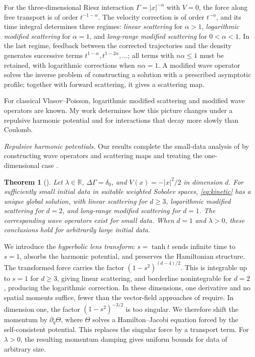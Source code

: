 \documentclass[10pt,reqno]{amsart}
\newtheorem{theorem}{Theorem}
\newcommand{\R}{\mathbb R}
\begin{document}
For the three-dimensional Riesz interaction $\Gamma=|x|^{-\alpha}$ with $V=0$, the force along free transport is of order $t^{-1-\alpha}$. The velocity correction is of order $t^{-\alpha}$, and its time integral determines three regimes: \emph{linear scattering} for $\alpha>1$, \emph{logarithmic modified scattering} for $\alpha=1$, and \emph{long-range modified scattering} for $0<\alpha<1$. In the last regime, feedback between the corrected trajectories and the density generates successive terms $t^{1-\alpha},t^{1-2\alpha},\ldots$; all terms with $n\alpha\leq1$ must be retained, with logarithmic corrections when $n\alpha=1$. A modified wave operator solves the inverse problem of constructing a solution with a prescribed asymptotic profile; together with forward scattering, it gives a scattering map.

For classical Vlasov--Poisson, logarithmic modified scattering \cite{CK16,IPWW22} and modified wave operators \cite{FOPW21} are known. My work determines how this picture changes under a repulsive harmonic potential and for interactions that decay more slowly than Coulomb.

\smallskip
\noindent\emph{Repulsive harmonic potentials.}
Our results complete the small-data analysis of \cite{VV24,BVV25} by constructing wave operators and scattering maps \cite{HK26} and treating the one-dimensional case \cite{H26}.
\begin{theorem}[\cite{H26,HK26}]\label{thm:harmonic}
Let $\lambda\in\R$, $\Delta\Gamma=\delta_0$, and $V(x)=-|x|^2/2$ in dimension $d$. For sufficiently small initial data in suitable weighted Sobolev spaces, \eqref{eq:kinetic} has a unique global solution, with linear scattering for $d\geq3$, logarithmic modified scattering for $d=2$, and long-range modified scattering for $d=1$. The corresponding wave operators exist for small data. When $d=1$ and $\lambda>0$, these conclusions hold for arbitrarily large initial data.
\end{theorem}
We introduce the \emph{hyperbolic lens transform}: $s=\tanh t$ sends infinite time to $s=1$, absorbs the harmonic potential, and preserves the Hamiltonian structure. The transformed force carries the factor $(1-s^2)^{(d-4)/2}$. This is integrable up to $s=1$ for $d\geq3$, giving linear scattering, and borderline nonintegrable for $d=2$, producing the logarithmic correction. In these dimensions, one derivative and no spatial moments suffice, fewer than the vector-field approaches of \cite{VV24,BVV25} require. In dimension one, the factor $(1-s^2)^{-3/2}$ is too singular. We therefore shift the momentum by $\partial_q\Theta$, where $\Theta$ solves a Hamilton--Jacobi equation forced by the self-consistent potential. This replaces the singular force by a transport term. For $\lambda>0$, the resulting momentum damping gives uniform bounds for data of arbitrary size.
\end{document}
